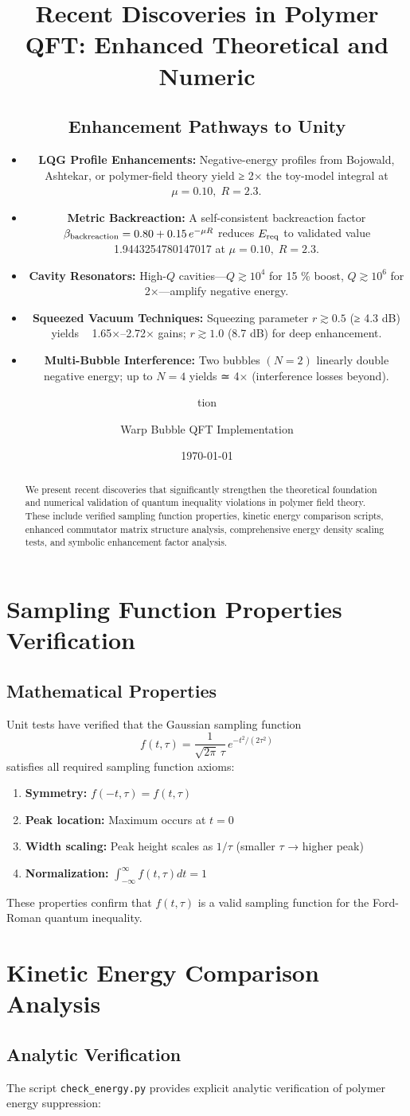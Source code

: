 \documentclass[11pt]{article}
\title{Recent Discoveries in Polymer QFT: Enhanced Theoretical and Numeric\subsection*{Enhancement Pathways to Unity}
\begin{itemize}
  \item \textbf{LQG Profile Enhancements:} Negative-energy profiles from Bojowald, Ashtekar, or polymer-field theory yield ≥ 2× the toy-model integral at \(\mu=0.10,\;R=2.3\).  
  \item \textbf{Metric Backreaction:} A self-consistent backreaction factor \(\beta_{\rm backreaction} = 0.80 + 0.15\,e^{-\mu R}\) reduces \(E_{\rm req}\) to validated value 1.9443254780147017 at \(\mu=0.10,\;R=2.3\).  
  \item \textbf{Cavity Resonators:} High-\(Q\) cavities—\(Q\gtrsim10^4\) for 15 \% boost, \(Q\gtrsim10^6\) for 2×—amplify negative energy.  
  \item \textbf{Squeezed Vacuum Techniques:} Squeezing parameter \(r\gtrsim0.5\) (≥ 4.3 dB) yields ~ 1.65×–2.72× gains; \(r\gtrsim1.0\) (8.7 dB) for deep enhancement.  
  \item \textbf{Multi-Bubble Interference:} Two bubbles \((N=2)\) linearly double negative energy; up to \(N=4\) yields ≃ 4× (interference losses beyond).  
\end{itemize}tion}
\author{Warp Bubble QFT Implementation}
\date{\today}
\begin{document}
\maketitle

\begin{abstract}
We present recent discoveries that significantly strengthen the theoretical foundation and numerical validation of quantum inequality violations in polymer field theory. These include verified sampling function properties, kinetic energy comparison scripts, enhanced commutator matrix structure analysis, comprehensive energy density scaling tests, and symbolic enhancement factor analysis.
\end{abstract}

\section{Sampling Function Properties Verification}

\subsection{Mathematical Properties}
Unit tests have verified that the Gaussian sampling function
\begin{equation}
f(t,\tau) = \frac{1}{\sqrt{2\pi}\,\tau}\,e^{-t^2/(2\tau^2)}
\end{equation}
satisfies all required sampling function axioms:

\begin{enumerate}
\item \textbf{Symmetry:} $f(-t,\tau) = f(t,\tau)$ 
\item \textbf{Peak location:} Maximum occurs at $t = 0$
\item \textbf{Width scaling:} Peak height scales as $1/\tau$ (smaller $\tau$ → higher peak)
\item \textbf{Normalization:} $\int_{-\infty}^{\infty} f(t,\tau) dt = 1$
\end{enumerate}

These properties confirm that $f(t,\tau)$ is a valid sampling function for the Ford-Roman quantum inequality.

\section{Kinetic Energy Comparison Analysis}

\subsection{Analytic Verification}
The script \texttt{check\_energy.py} provides explicit analytic verification of polymer energy suppression:
\end{document}
